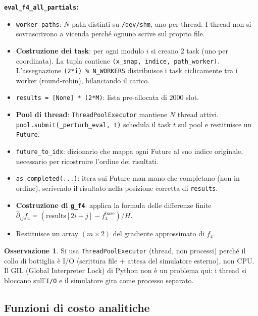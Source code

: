 \documentclass[12pt,a4paper]{article}
\theoremstyle{definition}
\newtheorem{remark}[theorem]{Osservazione}
\begin{document}
\textbf{\texttt{eval\_f4\_all\_partials}:}
\begin{itemize}[nosep]
  \item \texttt{worker\_paths}: $N$ path distinti su \texttt{/dev/shm}, uno per thread.
        I thread non si sovrascrivono a vicenda perché ognuno scrive sul proprio file.
  \item \textbf{Costruzione dei task}: per ogni modulo $i$ si creano 2 task (uno per
        coordinata). La tupla contiene \texttt{(x\_snap, indice, path\_worker)}.
        L'assegnazione \texttt{(2*i) \% N\_WORKERS} distribuisce i task ciclicamente tra
        i worker (round-robin), bilanciando il carico.
  \item \texttt{results = [None] * (2*M)}: lista pre-allocata di 2000 slot.
  \item \textbf{Pool di thread}: \texttt{ThreadPoolExecutor} mantiene $N$ thread attivi.
        \texttt{pool.submit(\_perturb\_eval, t)} schedula il task $t$ sul pool e restituisce
        un \texttt{Future}.
  \item \texttt{future\_to\_idx}: dizionario che mappa ogni Future al suo indice originale,
        necessario per ricostruire l'ordine dei risultati.
  \item \texttt{as\_completed(...)}: itera sui Future man mano che completano (non in ordine),
        scrivendo il risultato nella posizione corretta di \texttt{results}.
  \item \textbf{Costruzione di \texttt{g\_f4}}: applica la formula delle differenze finite
        $\hat{\partial}_{ij} f_4 = (\text{results}[2i+j] - f_4^{\text{base}}) / H$.
  \item Restituisce un array $(m \times 2)$ del gradiente approssimato di $f_4$.
\end{itemize}

\begin{remark}
Si usa \texttt{ThreadPoolExecutor} (thread, non processi) perché il collo di bottiglia è
I/O (scrittura file + attesa del simulatore esterno), non CPU.
Il GIL (Global Interpreter Lock) di Python non è un problema qui: i thread si bloccano
sull'\texttt{I/O} e il simulatore gira come processo separato.
\end{remark}

\subsection{Funzioni di costo analitiche}
\end{document}
